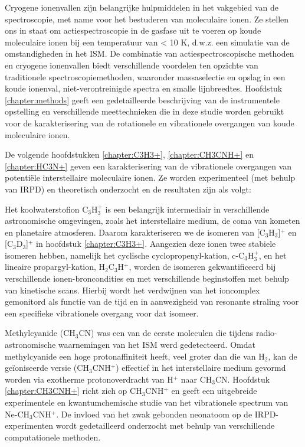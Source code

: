 {Cryogene ionenvallen zijn belangrijke hulpmiddelen in het vakgebied van de spectroscopie, met name voor het bestuderen van moleculaire ionen. Ze stellen ons in staat om actiespectroscopie in de gasfase uit te voeren op koude moleculaire ionen bij een temperatuur van < 10 K, d.w.z. een simulatie van de omstandigheden in het ISM. De combinatie van actiespectroscopische methoden en cryogene ionenvallen biedt verschillende voordelen ten opzichte van traditionele spectroscopiemethoden, waaronder massaselectie en opslag in een koude ionenval, niet-verontreinigde spectra en smalle lijnbreedtes. Hoofdstuk \ref{chapter:methods} geeft een gedetailleerde beschrijving van de instrumentele opstelling en verschillende meettechnieken die in deze studie worden gebruikt voor de karakterisering van de rotationele en vibrationele overgangen van koude moleculaire ionen.

De volgende hoofdstukken \ref{chapter:C3H3+}, \ref{chapter:CH3CNH+} en \ref{chapter:HC3N+} geven een karakterisering van de vibrationele overgangen van potentiële interstellaire moleculaire ionen. Ze worden experimenteel (met behulp van IRPD) en theoretisch onderzocht en de resultaten zijn als volgt:

Het koolwaterstofion C$_3$H$_3^+$ is een belangrijk intermediair in verschillende astronomische omgevingen, zoals het 
interstellaire medium, de coma van kometen en planetaire atmosferen. Daarom karakteriseren we de isomeren van 
[C$_3$H$_3$]$^+$ en [C$_3$D$_3$]$^+$ in hoofdstuk \ref{chapter:C3H3+}. Aangezien deze ionen twee stabiele isomeren hebben, namelijk het 
cyclische cyclopropenyl-kation, c-C$_3$H$_3^+$, en het lineaire propargyl-kation, H$_2$C$_3$H$^+$, worden de isomeren 
gekwantificeerd bij verschillende ionen-broncondities en met verschillende beginstoffen met behulp van kinetische 
scans. Hierbij wordt het verdwijnen van het ioncomplex gemonitord als functie van de tijd en in aanwezigheid van 
resonante straling voor een specifieke vibrationele overgang voor dat isomeer.

Methylcyanide (CH$_3$CN) was een van de eerste moleculen die tijdens radio-astronomische waarnemingen van het ISM werd gedetecteerd. Omdat methylcyanide een hoge protonaffiniteit heeft, veel groter dan die van H$_2$, kan de geïoniseerde versie (CH$_3$CNH$^+$) effectief in het interstellaire medium gevormd worden via exotherme protonoverdracht van H$^+$ naar CH$_3$CN.
Hoofdstuk \ref{chapter:CH3CNH+} richt zich op CH$_3$CNH$^+$ en geeft een uitgebreide experimentele en kwantumchemische studie van het vibrationele spectrum van Ne-CH$_3$CNH$^+$. De invloed van het zwak gebonden neonatoom op de IRPD-experimenten wordt gedetailleerd onderzocht met behulp van verschillende computationele methoden.

}

